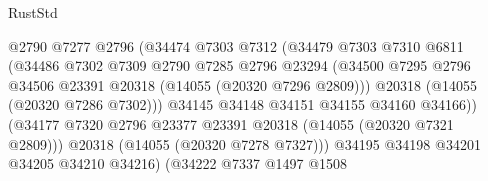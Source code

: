\begin{lexlean}{RustStd}
\begin{coremodule}
                                        @2790
                                        @7277
                                        @2796
                                        (@34474
                                          @7303
                                          @7312
                                          (@34479
                                            @7303
                                            @7310
                                            @6811
                                            (@34486
                                              @7302
                                              @7309
                                              @2790
                                              @7285
                                              @2796
                                              @23294
                                              (@34500
                                                @7295
                                                @2796
                                                @34506
                                                @23391
                                                @20318
                                                (@14055 (@20320 @7296 @2809)))
                                              @20318
                                              (@14055 (@20320 @7286 @7302)))
                                            @34145
                                            @34148
                                            @34151
                                            @34155
                                            @34160
                                            @34166))
                                        (@34177
                                          @7320
                                          @2796
                                          @23377
                                          @23391
                                          @20318
                                          (@14055 (@20320 @7321 @2809)))
                                        @20318
                                        (@14055 (@20320 @7278 @7327)))
                                      @34195
                                      @34198
                                      @34201
                                      @34205
                                      @34210
                                      @34216)
                                    (@34222
                                      @7337
                                      @1497
                                      @1508

\end{coremodule}
\end{lexlean}
